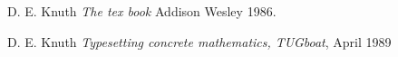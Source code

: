 \documentclass{article}
\begin{document}
















 \begin{thebibliography}{1}

   D. E. Knuth {\em The tex book }  Addison Wesley 1986.

    D. E. Knuth {\em Typesetting concrete mathematics, TUGboat}, April 1989

  \end{thebibliography}
\end{document}
